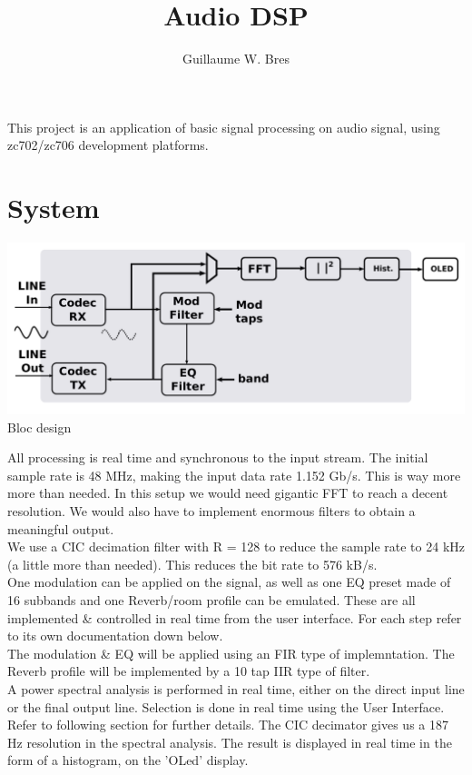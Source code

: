\documentclass{article}
\author{Guillaume W. Bres}
\title{Audio DSP}
\begin{document}
\maketitle

This project is an application of basic
signal processing on audio signal,
using zc702/zc706 development platforms.

\tableofcontents

\newpage
\section{System}


\begin{center}
	\includegraphics[width=0.75\linewidth]{bloc_design.pdf} \\
	Bloc design
\end{center}

All processing is real time and synchronous to the input
stream. The initial sample rate is 48 MHz, making the
input data rate 1.152 Gb/s. This is way more more than needed.
In this setup we would need gigantic FFT to reach a decent
resolution. We would also have to implement enormous filters
to obtain a meaningful output. \\

We use a CIC decimation filter with R = 128
to reduce the sample rate to 24 kHz (a little more than needed).
This reduces the bit rate to 576 kB/s. \\

One modulation can be applied on the signal,
as well as one EQ preset made of 16 subbands and
one Reverb/room profile can be emulated.
These are all implemented 
\& controlled in real time from the user interface.
For each step refer to its own documentation down below. \\

The modulation \& EQ will be applied using an FIR type
of implemntation. The Reverb profile will be implemented
by a 10 tap IIR type of filter. \\

A power spectral analysis is performed in real time,
either on the direct input line
or the final output line. Selection is done in
real time using the User Interface. Refer
to following section for further details.
The CIC decimator gives us a 187 Hz resolution in the spectral
analysis. The result is displayed in real time in the
form of a histogram, on the 'OLed' display. \\
\end{document}
